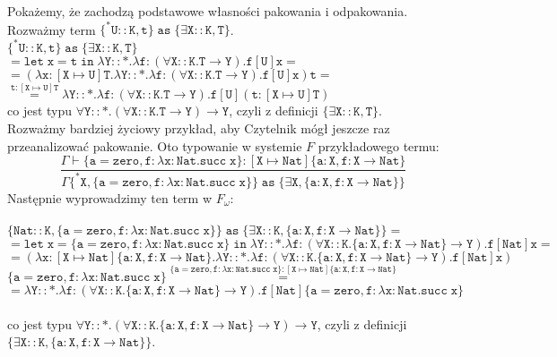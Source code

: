 \documentclass[11pt,leqno]{article}
\begin{document}
Pokażemy, że zachodzą podstawowe własności pakowania i odpakowania. \\
Rozważmy term $\mathtt{ \{^*U::K,t\}\;as\; \{\exists X::K,T\}}$. \\ 
$ \mathtt{ \{^*U::K,t\}\;as\; \{\exists X::K,T\} }$ \\ 
$ \mathtt{ = let\;x=t\;in\;\lambda Y::\ast.\lambda f:(\forall X::K.T \rightarrow Y).f[U]x = }$ \\
$ \mathtt{ = (\lambda x:[X \mapsto U]T.\lambda Y::\ast.\lambda f:(\forall X::K.T \rightarrow Y).f[U]x)t = }$ \\
$ \mathtt{ \overset{t:[X \mapsto U]T}{=} \lambda Y::\ast.\lambda f:(\forall X::K.T \rightarrow Y).f[U](t:[X \mapsto U]T)}$ \\
co jest typu $\mathtt{\forall Y::\ast.(\forall X::K.T \rightarrow Y) \rightarrow Y}$, czyli z definicji $\mathtt{\{\exists X::K,T\}}$. \\

Rozważmy bardziej życiowy przykład, aby Czytelnik mógł jeszcze raz przeanalizować pakowanie. Oto typowanie w systemie $F$ przykładowego termu:\\ 
 	\[\mathtt{ \frac{\Gamma \vdash \{a=zero, f:\lambda x:Nat.succ\;x\}:[X \mapsto Nat]\{a:X,f:X \rightarrow Nat\}}{\Gamma \{^*X,\{a=zero, f:\lambda x:Nat.succ\;x\}\}\;as\;\{\exists X,\{a:X,f:X \rightarrow Nat\}\}}
		}
	\]
Następnie wyprowadzimy ten term w $F_\omega$: \\ \\
\small{
$ \mathtt{ \{Nat::K,\{a=zero, f:\lambda x:Nat.succ\;x\}\}\;as\; \{\exists X::K,\{a:X, f:X \rightarrow Nat\}\}= }$ \\ 
$ \mathtt{ = let\;x=\{a=zero, f:\lambda x:Nat.succ\;x\}\;in\;\lambda Y::\ast.\lambda f:(\forall X::K.\{a:X, f:X \rightarrow Nat\} \rightarrow Y).f[Nat]x = }$ \\
$ \mathtt{ = (\lambda x:[X \mapsto Nat]\{a:X, f:X \rightarrow Nat\}.\lambda Y::\ast.\lambda f:(\forall X::K.\{a:X, f:X \rightarrow Nat\} \rightarrow Y).f[Nat]x)}$\\
$ \mathtt{ \{a=zero, f:\lambda x:Nat.succ\;x\} \overset{\{a=zero, f:\lambda x:Nat.succ\;x\}:[X \mapsto Nat]\{a:X, f:X \rightarrow Nat\}}{=}  }$ \\
$ \mathtt{ = \lambda Y::\ast.\lambda f:(\forall X::K.\{a:X, f:X \rightarrow Nat\} \rightarrow Y).f[Nat]\{a=zero, f:\lambda x:Nat.succ\;x\}}$ \\ \\
co jest typu $\mathtt{\forall Y::\ast.(\forall X::K.\{a:X, f:X \rightarrow Nat\} \rightarrow Y) \rightarrow Y}$, czyli z definicji $\mathtt{\{\exists X::K,\{a:X, f:X \rightarrow Nat\}\}}$. \\
}
\end{document}
